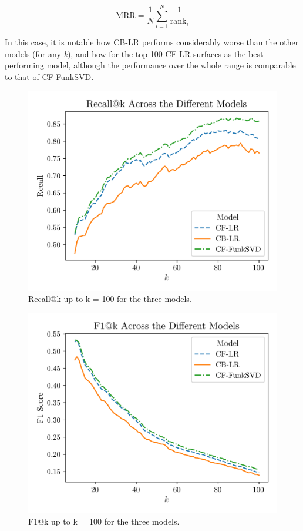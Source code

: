 \documentclass[conference]{IEEEtran}
\begin{document}
\begin{equation}
\text{MRR} = \frac{1}{N} \sum_{i=1}^{N} \frac{1}{\text{rank}_i}
\end{equation}

In this case, it is notable how CB-LR performs considerably worse than the other models (for any \textit{k}), and how for the top 100 CF-LR surfaces as the best performing model, although the performance over the whole range is comparable to that of CF-FunkSVD.

\begin{figure}[H]
    \centering
    \includegraphics[width=1\linewidth]{assets/results_recallK.png}
    \caption{Recall@k up to k = 100 for the three models.}
    \label{fig:results_recallK}
\end{figure}

\begin{figure}[H]
    \centering
    \includegraphics[width=1\linewidth]{assets/results_f1K.png}
    \caption{F1@k up to k = 100 for the three models.}
    \label{fig:results_f1K}
\end{figure}
\end{document}
